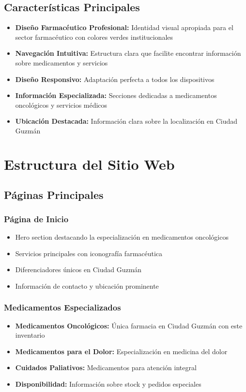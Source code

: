 \documentclass[12pt,a4paper]{article}
\begin{document}
\subsection{Características Principales}

\begin{itemize}[leftmargin=*]
    \item \textbf{Diseño Farmacéutico Profesional:} Identidad visual apropiada para el sector farmacéutico con colores verdes institucionales
    \item \textbf{Navegación Intuitiva:} Estructura clara que facilite encontrar información sobre medicamentos y servicios
    \item \textbf{Diseño Responsivo:} Adaptación perfecta a todos los dispositivos
    \item \textbf{Información Especializada:} Secciones dedicadas a medicamentos oncológicos y servicios médicos
    \item \textbf{Ubicación Destacada:} Información clara sobre la localización en Ciudad Guzmán
\end{itemize}

\section{Estructura del Sitio Web}

\subsection{Páginas Principales}

\subsubsection{Página de Inicio}
\begin{itemize}
    \item Hero section destacando la especialización en medicamentos oncológicos
    \item Servicios principales con iconografía farmacéutica
    \item Diferenciadores únicos en Ciudad Guzmán
    \item Información de contacto y ubicación prominente
\end{itemize}

\subsubsection{Medicamentos Especializados}
\begin{itemize}
    \item \textbf{Medicamentos Oncológicos:} Única farmacia en Ciudad Guzmán con este inventario
    \item \textbf{Medicamentos para el Dolor:} Especialización en medicina del dolor
    \item \textbf{Cuidados Paliativos:} Medicamentos para atención integral
    \item \textbf{Disponibilidad:} Información sobre stock y pedidos especiales
\end{itemize}
\end{document}
